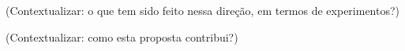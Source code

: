 
(Contextualizar: o que tem sido feito nessa direção, em termos de experimentos?)


(Contextualizar: como esta proposta contribui?)







